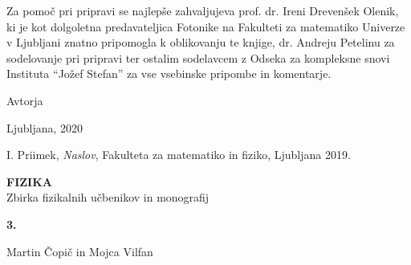 \documentclass[a4paper,10pt]{book}
\begin{document}
Za pomoč pri pripravi se najlepše zahvaljujeva prof. dr. Ireni Drevenšek Olenik, ki je 
kot dolgoletna predavateljica Fotonike na Fakulteti za matematiko Univerze v Ljubljani
znatno pripomogla k oblikovanju te knjige, dr. Andreju Petelinu za sodelovanje pri pripravi ter 
ostalim sodelavcem z Odseka za kompleksne snovi Instituta ``Jožef Stefan'' za vse vsebinske pripombe
in komentarje.

\vspace{1em}

Avtorja

\hfill Ljubljana, 2020


\lihastran
\tableofcontents


\lihastran













\lihastran
{}
\begin{thebibliography}{9}

   I. Priimek,
   \emph{Naslov},
   Fakulteta za matematiko in fiziko, Ljubljana 2019.

\end{thebibliography}


\lihastran
{}
\sloppy
\raggedright
\footnotesize
\printindex
\normalsize


\sodastran
\thispagestyle{empty}
\parindent=0pt

\textbf{FIZIKA} \\
Zbirka fizikalnih učbenikov in monografij

\bigskip
\bigskip
\textbf{\large 3.}

\bigskip
Martin Čopič in Mojca Vilfan
\end{document}
